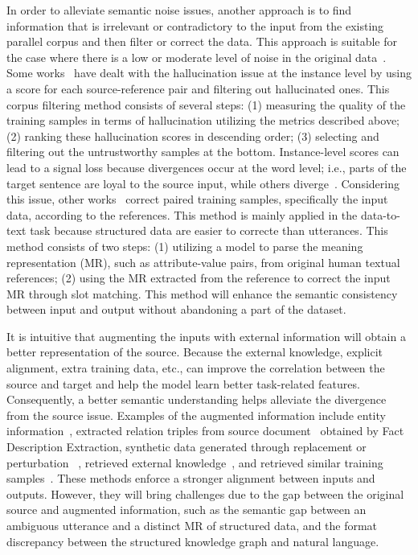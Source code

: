 In order to alleviate semantic noise issues, another approach is to find information that is irrelevant or contradictory to the input from the existing parallel corpus and then filter or correct the data. This approach is suitable for the case where there is a low or moderate level of noise in the original data~.
Some works~ have dealt with the hallucination issue at the instance level by using a score for each source-reference pair and filtering out hallucinated ones.
 This corpus filtering method consists of several steps:
 (1) measuring the quality of the training samples in terms of hallucination utilizing the metrics described above; 
 (2) ranking these hallucination scores in descending order;
 (3) selecting and filtering out the untrustworthy samples at the bottom.
Instance-level scores can lead to a signal loss because divergences occur at the word level; i.e., parts of the target sentence are loyal to the source input, while others diverge~.
Considering this issue, other works~ correct paired training samples, specifically the input data, according to the references. This method is mainly applied in the data-to-text task because structured data are easier to correcte than utterances.
This method consists of two steps: (1) utilizing a model to parse the meaning representation (MR), such as attribute-value pairs, from original human textual references; (2) using the MR extracted from the reference to correct the input MR through slot matching.
This method will enhance the semantic consistency between input and output without abandoning a part of the dataset.

\label{subsec:augment information}
It is intuitive that augmenting the inputs with external information will obtain a better representation of the source. Because the external knowledge, explicit alignment, extra training data, etc., can improve the correlation between the source and target and help the model learn better task-related features. Consequently, a better semantic understanding helps alleviate the divergence from the source issue.
Examples of the augmented information include entity information~, 
extracted relation triples from source document~ obtained by Fact Description Extraction, 
 synthetic data generated through replacement or perturbation ~,
retrieved external knowledge~, and retrieved similar training samples~.
These methods enforce a stronger alignment between inputs and outputs. 
However, they will bring challenges due to the gap between the original source and augmented information, such as the semantic gap between an ambiguous utterance and a distinct MR of structured data, 
and the format discrepancy between the structured knowledge graph and natural language.





